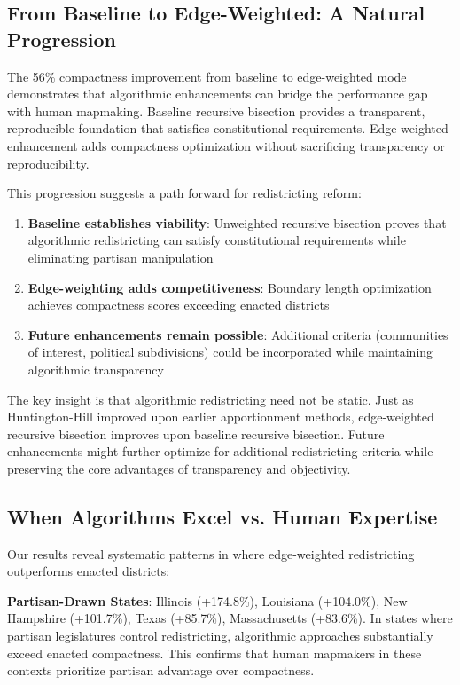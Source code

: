 \subsection{From Baseline to Edge-Weighted: A Natural Progression}

The 56\% compactness improvement from baseline to edge-weighted mode demonstrates that algorithmic enhancements can bridge the performance gap with human mapmaking. Baseline recursive bisection provides a transparent, reproducible foundation that satisfies constitutional requirements. Edge-weighted enhancement adds compactness optimization without sacrificing transparency or reproducibility.

This progression suggests a path forward for redistricting reform:

\begin{enumerate}
\item \textbf{Baseline establishes viability}: Unweighted recursive bisection proves that algorithmic redistricting can satisfy constitutional requirements while eliminating partisan manipulation
\item \textbf{Edge-weighting adds competitiveness}: Boundary length optimization achieves compactness scores exceeding enacted districts
\item \textbf{Future enhancements remain possible}: Additional criteria (communities of interest, political subdivisions) could be incorporated while maintaining algorithmic transparency
\end{enumerate}

The key insight is that algorithmic redistricting need not be static. Just as Huntington-Hill improved upon earlier apportionment methods, edge-weighted recursive bisection improves upon baseline recursive bisection. Future enhancements might further optimize for additional redistricting criteria while preserving the core advantages of transparency and objectivity.

\subsection{When Algorithms Excel vs. Human Expertise}

Our results reveal systematic patterns in where edge-weighted redistricting outperforms enacted districts:

\textbf{Partisan-Drawn States}: Illinois (+174.8\%), Louisiana (+104.0\%), New Hampshire (+101.7\%), Texas (+85.7\%), Massachusetts (+83.6\%). In states where partisan legislatures control redistricting, algorithmic approaches substantially exceed enacted compactness. This confirms that human mapmakers in these contexts prioritize partisan advantage over compactness.

